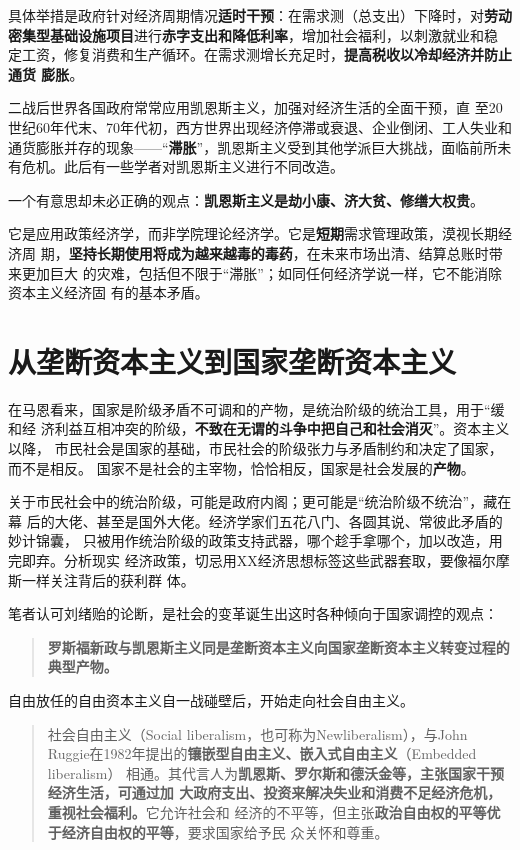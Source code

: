 具体举措是政府针对经济周期情况\textbf{适时干预}：在需求测（总支出）下降时，对\textbf{劳动
  密集型基础设施项目}进行\textbf{赤字支出和降低利率}，增加社会福利，以刺激就业和稳
定工资，修复消费和生产循环。在需求测增长充足时，\textbf{提高税收以冷却经济并防止通货
膨胀}。


二战后世界各国政府常常应用凯恩斯主义，加强对经济生活的全面干预，直
至20世纪60年代末、70年代初，西方世界出现经济停滞或衰退、企业倒闭、工人失业和
通货膨胀并存的现象——“\textbf{滞胀}”，凯恩斯主义受到其他学派巨大挑战，面临前所未
有危机。此后有一些学者对凯恩斯主义进行不同改造。

一个有意思却未必正确的观点：\textbf{凯恩斯主义是劫小康、济大贫、修缮大权贵}。

它是应用政策经济学，而非学院理论经济学。它是\textbf{短期}需求管理政策，漠视长期经济周
期，\textbf{坚持长期使用将成为越来越毒的毒药}，在未来市场出清、结算总账时带来更加巨大
的灾难，包括但不限于“滞胀”；如同任何经济学说一样，它不能消除资本主义经济固
有的基本矛盾。

\section{从垄断资本主义到国家垄断资本主义}

在马恩看来，国家是阶级矛盾不可调和的产物，是统治阶级的统治工具，用于“缓和经
济利益互相冲突的阶级，\textbf{不致在无谓的斗争中把自己和社会消灭}”。资本主义以降，
市民社会是国家的基础，市民社会的阶级张力与矛盾制约和决定了国家，而不是相反。
国家不是社会的主宰物，恰恰相反，国家是社会发展的\textbf{产物}。

关于市民社会中的统治阶级，可能是政府内阁；更可能是“统治阶级不统治”，藏在幕
后的大佬、甚至是国外大佬。经济学家们五花八门、各圆其说、常彼此矛盾的妙计锦囊，
只被用作统治阶级的政策支持武器，哪个趁手拿哪个，加以改造，用完即弃。分析现实
经济政策，切忌用XX经济思想标签这些武器套取，要像福尔摩斯一样关注背后的获利群
体。

笔者认可刘绪贻的论断，是社会的变革诞生出这时各种倾向于国家调控的观点：
\begin{quotation}
  \textbf{罗斯福新政与凯恩斯主义同是垄断资本主义向国家垄断资本主义转变过程的典型产物。}
\end{quotation}


自由放任的自由资本主义自一战碰壁后，开始走向社会自由主义。
\begin{quotation}

  社会自由主义（Social liberalism，也可称为Newliberalism），与John
  Ruggie在1982年提出的\textbf{镶嵌型自由主义、嵌入式自由主义}（Embedded liberalism）
  相通。其代言人为\textbf{凯恩斯、罗尔斯和德沃金等，主张国家干预经济生活，可通过加
    大政府支出、投资来解决失业和消费不足经济危机，重视社会福利。}它允许社会和
  经济的不平等，但主张\textbf{政治自由权的平等优于经济自由权的平等}，要求国家给予民
  众关怀和尊重。\cite{newneo}
\end{quotation}

